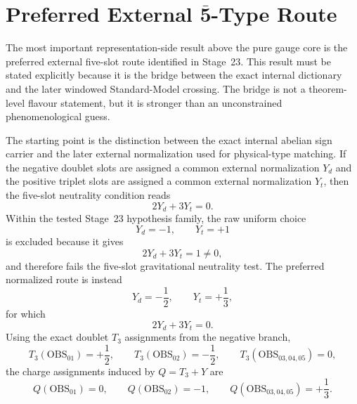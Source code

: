 \documentclass[11pt]{article}
\begin{document}
\section{Preferred External \texorpdfstring{$\bar{\mathbf 5}$}{5bar}-Type Route}
The most important representation-side result above the pure gauge core is the preferred external five-slot route identified in Stage~23. This result must be stated explicitly because it is the bridge between the exact internal dictionary and the later windowed Standard-Model crossing. The bridge is not a theorem-level flavour statement, but it is stronger than an unconstrained phenomenological guess.

The starting point is the distinction between the exact internal abelian sign carrier and the later external normalization used for physical-type matching. If the negative doublet slots are assigned a common external normalization $Y_d$ and the positive triplet slots are assigned a common external normalization $Y_t$, then the five-slot neutrality condition reads
\begin{equation}
2Y_d + 3Y_t = 0.
\label{eq:fivebar-neutrality}
\end{equation}
Within the tested Stage~23 hypothesis family, the raw uniform choice
\begin{equation}
Y_d=-1,\qquad Y_t=+1
\label{eq:fivebar-raw-choice}
\end{equation}
is excluded because it gives
\begin{equation}
2Y_d+3Y_t = 1 \neq 0,
\label{eq:fivebar-raw-exclusion}
\end{equation}
and therefore fails the five-slot gravitational neutrality test. The preferred normalized route is instead
\begin{equation}
Y_d=-\frac{1}{2},\qquad Y_t=+\frac{1}{3},
\label{eq:fivebar-preferred-normalization}
\end{equation}
for which
\begin{equation}
2Y_d+3Y_t = 0.
\label{eq:fivebar-preferred-neutrality}
\end{equation}
Using the exact doublet $T_3$ assignments from the negative branch,
\begin{equation}
T_3(\mathrm{OBS}_{01})=+\frac{1}{2},\qquad T_3(\mathrm{OBS}_{02})=-\frac{1}{2},
\qquad T_3(\mathrm{OBS}_{03,04,05})=0,
\label{eq:fivebar-t3-assignments}
\end{equation}
the charge assignments induced by $Q=T_3+Y$ are
\begin{equation}
Q(\mathrm{OBS}_{01})=0,
\qquad
Q(\mathrm{OBS}_{02})=-1,
\qquad
Q(\mathrm{OBS}_{03,04,05})=+\frac{1}{3}.
\label{eq:fivebar-charge-assignments}
\end{equation}
\end{document}
